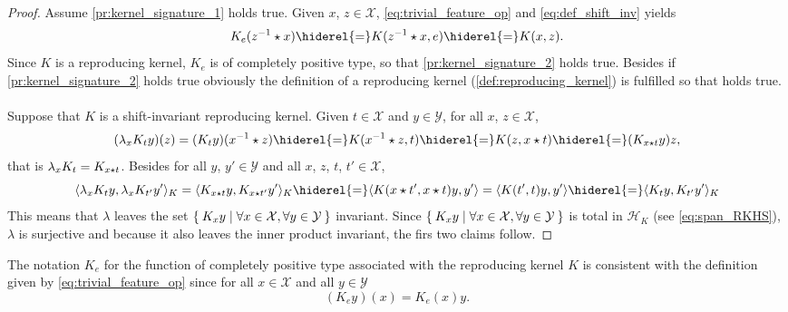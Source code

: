 \begin{proof} Assume \cref{pr:kernel_signature_1} holds true. Given $x$, $z\in\mathcal{X}$, \cref{eq:trivial_feature_op} and \cref{eq:def_shift_inv} yields
\begin{dmath*}
K_e(\inv{z}\groupop x)\hiderel{=}K(\inv{z} \groupop x,e)\hiderel{=}K(x,z).
\end{dmath*}
Since $K$ is a reproducing kernel, $K_e$ is of completely positive type, so that \cref{pr:kernel_signature_2} holds true. Besides if \cref{pr:kernel_signature_2} holds true obviously the definition of a reproducing kernel (\cref{def:reproducing_kernel}) is fulfilled so that \label{pr:kernel_signature_1} holds true.
\paragraph{}
Suppose that $K$ is a shift-invariant reproducing kernel. Given $t\in\mathcal{X}$ and $y\in\mathcal{Y}$, for all $x$, $z\in\mathcal{X}$,
\begin{dmath*}
(\lambda_xK_ty)(z)=(K_ty)(\inv{x}\groupop z)\hiderel{=}K(\inv{x}\groupop z,t)\hiderel{=}K(z,x\groupop t)\hiderel{=}(K_{x\groupop t}y)z,
\end{dmath*}
that is $\lambda_xK_t=K_{x\star t}$. Besides for all $y$, $y'\in\mathcal{Y}$ and all $x$, $z$, $t$, $t'\in\mathcal{X}$,
\begin{dmath*}
\inner{\lambda_xK_ty, \lambda_xK_{t'}y'}_K=\inner{K_{x\groupop t}y, K_{x \groupop t'}y'}_K\hiderel{=}\inner{K(x \groupop t', x \groupop t)y,y'}=\inner{K(t',t)y, y'}\hiderel{=}\inner{K_ty, K_{t'}y'}_K
\end{dmath*}
This means that $\lambda$ leaves the set $\Set{K_xy|\forall x\in\mathcal{X}, \forall y\in\mathcal{Y}}$ invariant. 
Since $\Set{K_xy|\forall x\in\mathcal{X}, \forall y\in\mathcal{Y}}$ is total in $\mathcal{H}_K$ (see \cref{eq:span_RKHS}), $\lambda$ is surjective and because it also leaves the inner product invariant, the firs two claims follow.
\end{proof}
The notation $K_e$ for the function of completely positive type associated with the reproducing kernel $K$
is consistent with the definition given by \cref{eq:trivial_feature_op} since for all $x\in\mathcal{X}$ and all $y\in\mathcal{Y}$
\begin{dmath*}
(K_ey)(x)=K_e(x)y.
\end{dmath*}

